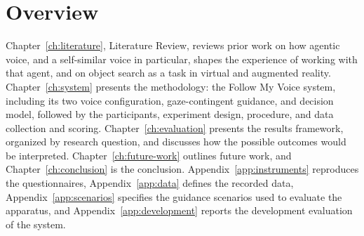 \section{Overview}
Chapter~\ref{ch:literature}, Literature Review, reviews prior work on how agentic voice, and a self-similar voice in particular, shapes the experience of working with that agent, and on object search as a task in virtual and augmented reality. Chapter~\ref{ch:system} presents the methodology: the Follow My Voice system, including its two voice configuration, gaze-contingent guidance, and decision model, followed by the participants, experiment design, procedure, and data collection and scoring. Chapter~\ref{ch:evaluation} presents the results framework, organized by research question, and discusses how the possible outcomes would be interpreted. Chapter~\ref{ch:future-work} outlines future work, and Chapter~\ref{ch:conclusion} is the conclusion. Appendix~\ref{app:instruments} reproduces the questionnaires, Appendix~\ref{app:data} defines the recorded data, Appendix~\ref{app:scenarios} specifies the guidance scenarios used to evaluate the apparatus, and Appendix~\ref{app:development} reports the development evaluation of the system.
